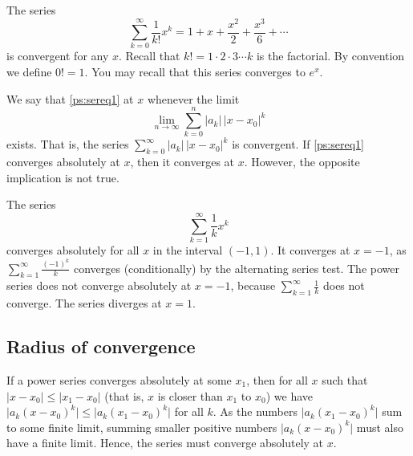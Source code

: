 \documentclass{ximera}
\begin{document}
\begin{example} \label{ps:expex}
    The series
    \begin{equation*}
        \sum_{k=0}^\infty \frac{1}{k!} x^k = 1 + x + \frac{x^2}{2} + \frac{x^3}{6} + \cdots
    \end{equation*}
    is convergent for any $x$. Recall that $k! = 1\cdot 2\cdot 3 \cdots k$ is the factorial.  By convention we define $0! = 1$. You may recall that this series converges to $e^x$.
\end{example}

We say that \eqref{ps:sereq1} \emph{} at $x$ whenever the limit
\begin{equation*}
    \lim_{n\to\infty} \sum_{k=0}^n \lvert a_k \rvert \, {\lvert x-x_0 \rvert}^k 
\end{equation*}
exists.  That is, the series $\sum_{k=0}^\infty \lvert a_k \rvert \, {\lvert x-x_0 \rvert}^k$ is convergent. If \eqref{ps:sereq1} converges absolutely at $x$, then it converges at $x$.  However, the opposite implication is not true.

\begin{example} \label{ps:1kex}
    The series
    \begin{equation*}
        \sum_{k=1}^\infty \frac{1}{k} x^k
    \end{equation*}
    converges absolutely for all $x$ in the interval $(-1,1)$. It converges at $x=-1$, as $\sum_{k=1}^\infty \frac{{(-1)}^k}{k}$ converges (conditionally) by the alternating series test. The power series does not converge absolutely at $x=-1$, because $\sum_{k=1}^\infty \frac{1}{k}$ does not converge. The series diverges at $x=1$.
\end{example}

\subsection{Radius of convergence}

If a power series converges absolutely at some $x_1$, then for all $x$ such that $\lvert x - x_0  \rvert \leq \lvert x_1 - x_0 \vert$ (that is, $x$ is closer than $x_1$ to $x_0$) we have $\bigl\lvert a_k {(x-x_0)}^k \bigr\rvert \leq \bigl\lvert a_k {(x_1-x_0)}^k \bigr\rvert$ for all $k$. As the numbers $\bigl\lvert a_k {(x_1-x_0)}^k \bigr\rvert$ sum to some finite limit, summing smaller positive numbers $\bigl\lvert a_k {(x-x_0)}^k \bigr\rvert$ must also have a finite limit. Hence, the series must converge absolutely at $x$. %
\end{document}
